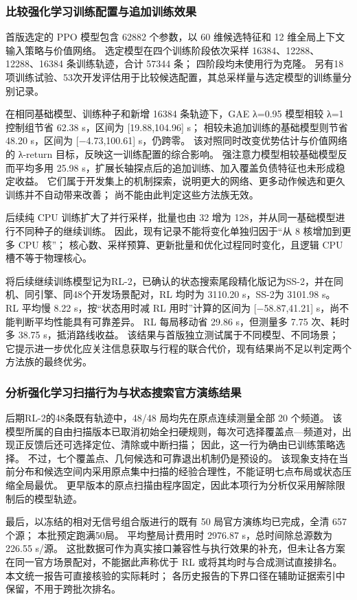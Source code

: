 \subsubsection{比较强化学习训练配置与追加训练效果}\label{sec:q3-11}

首版选定的 PPO 模型包含 62882 个参数，以 60 维候选特征和 12 维全局上下文输入策略与价值网络。
选定模型在四个训练阶段依次采样 16384、12288、12288、16384 条训练轨迹，合计 57344 条；
四阶段均未使用行为克隆。
另有18项训练试验、53次开发评估用于比较候选配置，其总采样量与选定模型的训练量分别记录。

在相同基础模型、训练种子和新增 16384 条轨迹下，GAE λ=0.95 模型相较 λ=1 控制组节省 62.38 s，区间为 {[}19.88,104.96{]} s；
相较未追加训练的基础模型则节省 48.20 s，区间为 {[}−4.73,100.61{]} s，仍跨零。
该对照同时改变优势估计与价值网络的 λ-return 目标，反映这一训练配置的综合影响。
强注意力模型相较基础模型反而平均多用 25.98 s，扩展长轴探点后的追加训练、加入覆盖负债特征也未形成稳定收益。
它们属于开发集上的机制探索，说明更大的网络、更多动作候选和更久训练并不自动带来改善；
尚不能由此判定这些方法族无效。

后续纯 CPU 训练扩大了并行采样，批量也由 32 增为 128，并从同一基础模型进行不同种子的继续训练。
因此，现有记录不能将变化单独归因于``从 8 核增加到更多 CPU 核''；
核心数、采样预算、更新批量和优化过程同时变化，且逻辑 CPU 槽不等于物理核心。

将后续继续训练模型记为RL-2，已确认的状态搜索尾段精化版记为SS-2，并在同机、同引擎、同48个开发场景配对，RL 均时为 3110.20 s，SS-2为 3101.98 s。
RL 平均慢 8.22 s，按``状态用时减 RL 用时''计算的区间为 {[}−58.87,41.21{]} s，尚不能判断平均性能具有可靠差异。
RL 每局移动省 29.86 s，但测量多 7.75 次、耗时多 38.75 s，抵消路线收益。
该结果与首版独立测试属于不同模型、不同场景；
它提示进一步优化应关注信息获取与行程的联合代价，现有结果尚不足以判定两个方法族的最终优劣。

\subsubsection{分析强化学习扫描行为与状态搜索官方演练结果}\label{sec:q3-12}

后期RL-2的48条既有轨迹中，48/48 局均先在原点连续测量全部 20 个频道。
该模型所属的自由扫描版本已取消初始全扫硬规则，每次可选择覆盖点---频道对，出现正反馈后还可选择定位、清除或中断扫描；
因此，这一行为确由已训练策略选择。
不过，七个覆盖点、几何候选和可靠退出机制仍是预设的。
该现象支持在当前分布和候选空间内采用原点集中扫描的经验合理性，不能证明七点布局或状态压缩全局最优。
更早版本的原点扫描由程序固定，因此本项行为分析仅采用解除限制后的模型轨迹。

最后，以冻结的相对无信号组合版进行的既有 50 局官方演练均已完成，全清 657 个源；
本批预定跑满50局。
平均整局计费用时 2976.87 s，总时间除总源数为 226.55 s/源。
这批数据可作为真实接口兼容性与执行效果的补充，但未让各方案在同一官方场景配对，不能据此声称优于 RL 或将其均时与合成测试直接排名。
本文统一报告可直接核验的实际耗时；
各历史报告的下界口径在辅助证据索引中保留，不用于跨批次排名。

